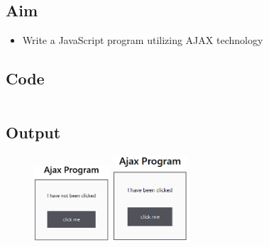 \documentclass{article}
\begin{document}
\subsection{Aim}
\begin{itemize}
  \item Write a JavaScript program utilizing AJAX technology
\end{itemize}

\subsection{Code}
\inputminted[frame=lines, breaklines, breakanywhere, numberblanklines=false]{html}{./prog_20/index.html}

\subsection{Output}
\begin{figure}[h!]
	\centering
	\includegraphics[width=0.25\textwidth]{./Assets/p2001.png}
	\includegraphics[width=0.25\textwidth]{./Assets/p2002.png}
\end{figure}
\newpage
\end{document}
